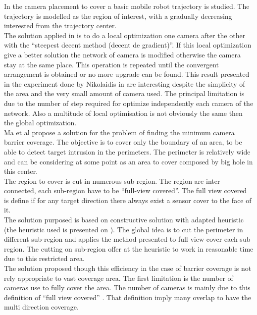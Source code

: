 In \cite{81*nikolaidis2009} the camera placement to cover a basic mobile robot trajectory is studied.
The trajectory is modelled as the region of interest, with a gradually decreasing interested from the trajectory center.\\
  The solution applied in  \cite{81*nikolaidis2009} is to do a local optimization one camera after the other with the “steepest decent method (decent de gradient)”. If this local optimization give a better solution the network of camera is modified otherwise the camera stay at the same place. This operation is repeated until the convergent arrangement is obtained or no more upgrade can be found. This result presented in the experiment done by Nikolaidis in  \cite{81*nikolaidis2009} are interesting despite the simplicity of the area and the very small amount of camera used.  The principal limitation is due to the number of step required for optimize independently each camera of the network. Also a multitude of local optimisation is not obviously the same then the global optimization.\\

Ma et al \cite{37*ma2012} propose a solution for the problem of finding the minimum camera barrier coverage. The objective is to cover only the boundary of an area, to be able to detect target intrusion in the perimeters. The perimeter is relatively wide and can be considering at some point as an area to cover composed by big hole in this center.\\
 The region to cover is cut in numerous sub-region. The region are inter connected, each sub-region have to be “full-view covered”. The full view covered is define if for any target direction there always exist a sensor cover to the face of it.\\
The solution purposed is based on constructive solution with adapted heuristic (the heuristic used is presented on \cite{37*ma2012}). The global idea is to cut the perimeter in different sub-region and applies the method presented to full view cover  each sub region. 
The cutting on sub-region offer at the heuristic to work in reasonable time due to this restricted area.\\
The solution proposed though this efficiency in the case of barrier coverage is not rely appropriate to vast coverage area. The first limitation is the number of cameras use to fully cover the area. The number of cameras is mainly due to this definition of “full view covered” . That definition  imply many overlap to have the multi direction coverage.\\


